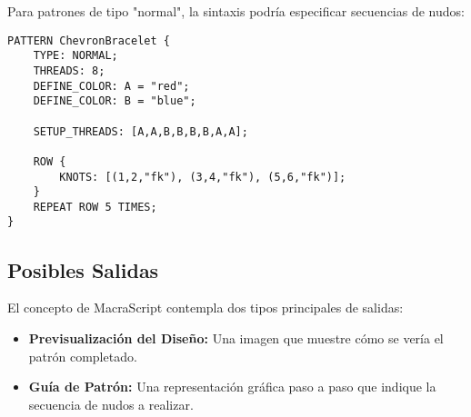 \documentclass[conference]{IEEEtran}
\begin{document}
Para patrones de tipo "normal", la sintaxis podría especificar secuencias de nudos:

\begin{verbatim}
PATTERN ChevronBracelet {
    TYPE: NORMAL;
    THREADS: 8;
    DEFINE_COLOR: A = "red";
    DEFINE_COLOR: B = "blue";

    SETUP_THREADS: [A,A,B,B,B,B,A,A];

    ROW {
        KNOTS: [(1,2,"fk"), (3,4,"fk"), (5,6,"fk")];
    }
    REPEAT ROW 5 TIMES;
}
\end{verbatim}

\subsection{Posibles Salidas}
El concepto de MacraScript contempla dos tipos principales de salidas:

\begin{itemize}
    \item \textbf{Previsualización del Diseño:} Una imagen que muestre cómo se vería el patrón completado.
    \item \textbf{Guía de Patrón:} Una representación gráfica paso a paso que indique la secuencia de nudos a realizar.
\end{itemize}
\end{document}
